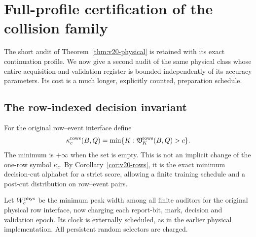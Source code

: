 \section{Full-profile certification of the collision family}
\label{sec:v21-physical}
The short audit of Theorem~\ref{thm:v20-physical} is retained with its
exact continuation profile. We now give a second audit of the same
physical class whose entire acquisition-and-validation register is
bounded independently of its accuracy parameters. Its cost is a much
longer, explicitly counted, preparation schedule.

\subsection{The row-indexed decision invariant}
For the original row--event interface define
\begin{equation}\label{eq:v21-kapparows}
 \kappa_c^{\rm rows}(B,Q)=
 \min\{K:\mathfrak V_K^{\rm rows}(B,Q)>c\}.
\end{equation}
The minimum is $+\infty$ when the set is empty. This is not an implicit
change of the one-row symbol $\kappa_c$. By
Corollary~\ref{cor:v20-rows}, it is the exact minimum decision-cut
alphabet for a strict score, allowing a finite training schedule and a
post-cut distribution on row--event pairs.

Let $W_c^{\rm phys}$ be the minimum peak width among all finite auditors
for the original physical row interface, now charging each report-bit,
mark, decision and validation epoch. Its clock is externally scheduled,
as in the earlier physical implementation. All persistent random
selectors are charged.

